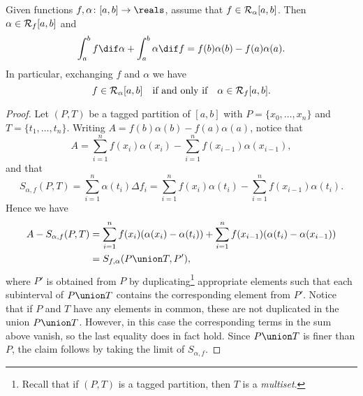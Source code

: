 \documentclass[article, a4paper, 11pt, oneside]{memoir}
\numberwithin{equation}{chapter}
\begin{document}
\begin{proposition}
    \label{prop:integration-by-parts}
    Given functions $f,\alpha \colon [a,b] \to \reals$, assume that $f \in \integrable[\alpha]{a,b}$. Then $\alpha \in \integrable[f]{a,b}$ and
    \begin{equation*}
        \int_a^b f \dif\alpha + \int_a^b \alpha \dif f
            = f(b)\alpha(b) - f(a)\alpha(a).
    \end{equation*}
    In particular, exchanging $f$ and $\alpha$ we have
    \begin{equation*}
        f \in \integrable[\alpha]{a,b}
            \quad \text{if and only if} \quad
            \alpha \in \integrable[f]{a,b}.
    \end{equation*}
\end{proposition}

\begin{proof}
    Let $(P,T)$ be a tagged partition of $[a,b]$ with $P = \{x_0, \ldots, x_n\}$ and $T = \{t_1, \ldots, t_n\}$. Writing $A = f(b)\alpha(b) - f(a)\alpha(a)$, notice that
    \begin{equation*}
        A
            = \sum_{i=1}^n f(x_i) \alpha(x_i) - \sum_{i=1}^n f(x_{i-1}) \alpha(x_{i-1}),
    \end{equation*}
    and that
    \begin{equation*}
        S_{\alpha,f}(P,T)
            = \sum_{i=1}^n \alpha(t_i) \Delta f_i
            = \sum_{i=1}^n f(x_i) \alpha(t_i) - \sum_{i=1}^n f(x_{i-1}) \alpha(t_i).
    \end{equation*}
    Hence we have
    \begin{align*}
        A - S_{\alpha,f}(P,T)
            &= \sum_{i=1}^n f(x_i) (\alpha(x_i) - \alpha(t_i)) + \sum_{i=1}^n f(x_{i-1}) (\alpha(t_i) - \alpha(x_{i-1})) \\
            &= S_{f,\alpha}(P \union T, P'),
    \end{align*}
    where $P'$ is obtained from $P$ by duplicating\footnote{Recall that if $(P,T)$ is a tagged partition, then $T$ is a \emph{multiset}.} appropriate elements such that each subinterval of $P \union T$ contains the corresponding element from $P'$. Notice that if $P$ and $T$ have any elements in common, these are not duplicated in the union $P \union T$. However, in this case the corresponding terms in the sum above vanish, so the last equality does in fact hold. Since $P \union T$ is finer than $P$, the claim follows by taking the limit of $S_{\alpha,f}$.
\end{proof}
\end{document}
